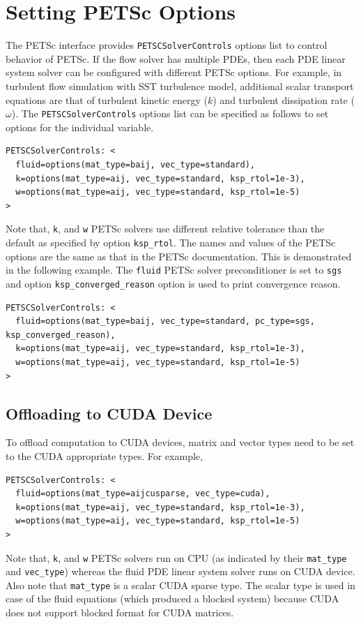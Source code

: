 \documentclass{article}
\begin{document}
\section{Setting PETSc Options}
The PETSc interface provides \texttt{PETSCSolverControls} options list
to control behavior of PETSc. If the flow solver has multiple PDEs,
then each PDE linear system solver can be configured with different
PETSc options. For example, in turbulent flow simulation with SST
turbulence model, additional scalar transport equations are that of
turbulent kinetic energy ($k$) and turbulent dissipation rate
($\omega$). The \texttt{PETSCSolverControls} options list can be
specified as follows to set options for the individual variable.
\begin{verbatim}
PETSCSolverControls: <
  fluid=options(mat_type=baij, vec_type=standard),
  k=options(mat_type=aij, vec_type=standard, ksp_rtol=1e-3),
  w=options(mat_type=aij, vec_type=standard, ksp_rtol=1e-5)
>
\end{verbatim}
Note that, \texttt{k}, and \texttt{w} PETSc solvers use different
relative tolerance than the default as specified by option
\texttt{ksp\_rtol}. The names and values of the PETSc options are the
same as that in the PETSc documentation. This is demonstrated in the
following example.  The \texttt{fluid} PETSc solver preconditioner is
set to \texttt{sgs} and option \texttt{ksp\_converged\_reason} option
is used to print convergence reason.
\begin{verbatim}
PETSCSolverControls: <
  fluid=options(mat_type=baij, vec_type=standard, pc_type=sgs, ksp_converged_reason),
  k=options(mat_type=aij, vec_type=standard, ksp_rtol=1e-3),
  w=options(mat_type=aij, vec_type=standard, ksp_rtol=1e-5)
>
\end{verbatim}

\subsection{Offloading to CUDA Device}
To offload computation to CUDA devices, matrix and vector types need
to be set to the CUDA appropriate types. For example,
\begin{verbatim}
PETSCSolverControls: <
  fluid=options(mat_type=aijcusparse, vec_type=cuda),
  k=options(mat_type=aij, vec_type=standard, ksp_rtol=1e-3),
  w=options(mat_type=aij, vec_type=standard, ksp_rtol=1e-5)
>
\end{verbatim}
Note that, \texttt{k}, and \texttt{w} PETSc solvers run on CPU (as
indicated by their \texttt{mat\_type} and \texttt{vec\_type}) whereas
the fluid PDE linear system solver runs on CUDA device. Also note that
\texttt{mat\_type} is a scalar CUDA sparse type. The scalar type is
used in case of the fluid equations (which produced a blocked system)
because CUDA does not support blocked format for CUDA matrices.
\end{document}
